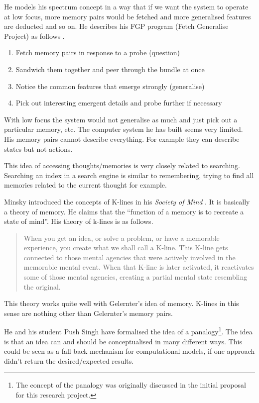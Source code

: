 He models his spectrum concept in a way that if we want the system to operate at low focus, more memory pairs would be fetched and more generalised features are deducted and so on. He describes his FGP program (Fetch Generalise Project) as follows \autocite[p.132]{Gelernter1994}.

\begin{enumerate}
  \item Fetch memory pairs in response to a probe (question)
  \item Sandwich them together and peer through the bundle at once
  \item Notice the common features that emerge strongly (generalise)
  \item Pick out interesting emergent details and probe further if necessary
\end{enumerate}

With low focus the system would not generalise as much and just pick out a particular memory, etc. The computer system he has built seems very limited. His memory pairs cannot describe everything. For example they can describe states but not actions.

This idea of accessing thoughts/memories is very closely related to searching. Searching an index in a search engine is similar to remembering, trying to find all memories related to the current thought for example.

\spirals

Minsky introduced the concepts of K-lines in his \textit{Society of Mind} \citeyear{Minsky1980, Minsky1988}. It is basically a theory of memory. He claims that the ``function of a memory is to recreate a state of mind''. His theory of k-lines is as follows.

\begin{quotation}
  When you get an idea, or solve a problem, or have a memorable experience, you create what we shall call a K-line. This K-line gets connected to those mental agencies that were actively involved in the memorable mental event. When that K-line is later activated, it reactivates some of those mental agencies, creating a partial mental state resembling the original. 
\end{quotation}

This theory works quite well with Gelernter's idea of memory. K-lines in this sense are nothing other than Gelernter's memory pairs.

He and his student Push Singh have formalised the idea of a panalogy\footnote{The concept of the panalogy was originally discussed in the initial proposal for this research project.}. The idea is that an idea can and should be conceptualised in many different ways. This could be seen as a fall-back mechanism for computational models, if one approach didn't return the desired/expected results.

